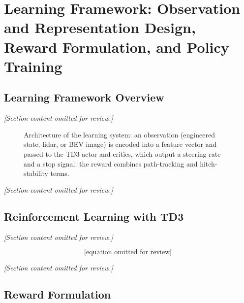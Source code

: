 \chapter{Learning Framework: Observation and Representation Design, Reward Formulation, and Policy Training}
\label{ch:learning_framework}

\section{Learning Framework Overview}
\textit{[Section content omitted for review.]}

\begin{figure}[H]
    \centering
    \caption{Architecture of the learning system: an observation (engineered state, lidar, or BEV image) is encoded into a feature vector and passed to the TD3 actor and critics, which output a steering rate and a stop signal; the reward combines path-tracking and hitch-stability terms.}
    \label{fig:learning_framework}
\end{figure}

\textit{[Section content omitted for review.]}

\section{Reinforcement Learning with TD3}
\textit{[Section content omitted for review.]}

\begin{equation}
\text{[equation omitted for review]}
\label{eq:td3_target}
\end{equation}

\textit{[Section content omitted for review.]}

\section{Reward Formulation}


